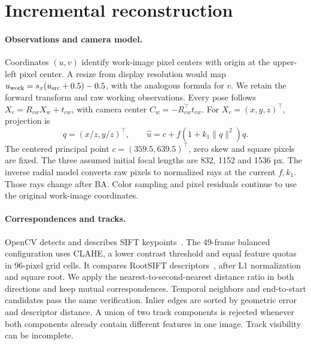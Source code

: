 \documentclass[11pt,a4paper]{article}
\begin{document}
\section{Incremental reconstruction}

\paragraph{Observations and camera model.}
Coordinates \((u,v)\) identify work-image pixel centers with origin at the
upper-left pixel center. A resize from display resolution would map
\(u_{\rm work}=s_x(u_{\rm src}+0.5)-0.5\), with the analogous formula for
\(v\). We retain the forward transform and raw working observations. Every
pose follows \(X_c=R_{cw}X_w+t_{cw}\), with camera center
\(C_w=-R_{cw}^{\top}t_{cw}\). For \(X_c=(x,y,z)^\top\), projection is
\[
  q=(x/z,y/z)^\top,\qquad
  \widehat u=c+f\left(1+k_1\|q\|^2\right)q .
\]
The centered principal point \(c=(359.5,639.5)^\top\), zero skew and square
pixels are fixed. The three assumed initial focal lengths are 832, 1152 and
1536 px. The inverse radial model converts raw pixels to normalized rays at
the current \(f,k_1\). Those rays change after BA. Color sampling and pixel
residuals continue to use the original work-image coordinates.

\paragraph{Correspondences and tracks.}
OpenCV detects and describes SIFT keypoints~\cite{lowe2004sift}. The
49-frame balanced configuration uses CLAHE, a lower contrast threshold and
equal feature quotas in 96-pixel grid cells. It compares RootSIFT
descriptors~\cite{arandjelovic2012root}, after L1 normalization and square
root. We apply the nearest-to-second-nearest distance ratio in both
directions and keep mutual correspondences. Temporal neighbors and
end-to-start candidates pass the same verification. Inlier edges are sorted
by geometric error and descriptor distance. A union of two track
components is rejected whenever both components already contain different
features in one image. Track visibility can be incomplete.
\end{document}
